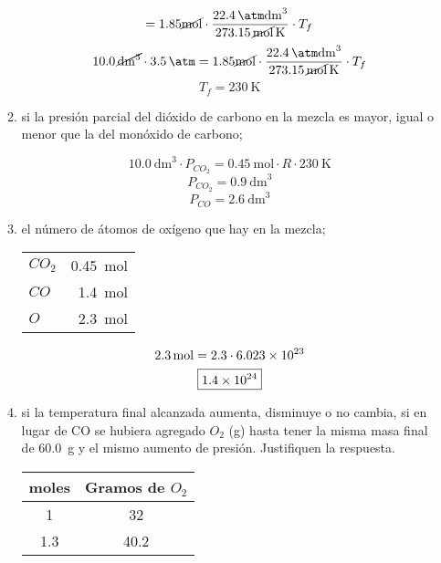 \documentclass[../practica.root.tex]{subfiles}
\begin{document}
\begin{enumerate}
\begin{enumerate}
\begin{center}
\[				            = \num{1,85}\si{\cancel\mole}
				            \cdot\frac{\SI{22,4}{\cancel\atm\cancel\dm\cubed}}{\SI{273,15}{\cancel\mole\kelvin}}
				            \cdot T_f
			            \]
			            \[
				            \SI{10,0}{\cancel\dm\cubed}\cdot\SI{3,5}{\cancel\atm}
				            = \num{1,85}\si{\cancel\mole}
				            \cdot\frac{\SI{22,4}{\cancel\atm\cancel\dm\cubed}}{\SI{273,15}{\cancel\mole\kelvin}}
				            \cdot T_f
			            \]
			            \[ \boxed{T_f = \SI{230}{\kelvin}} \]
		            \end{center}
		      \item si la presión parcial del dióxido de carbono en la mezcla es mayor, igual o menor que
		            la del monóxido de carbono;
		            \begin{center}
			            \[ \SI{10,0}{\dm\cubed}\cdot P_{CO_2} = \SI{0,45}{\mole}\cdot R\cdot\SI{230}{\kelvin} \]
			            \[ P_{CO_2} = \SI{0,9}{\dm\cubed} \]
			            \[ P_{CO} = \SI{2,6}{\dm\cubed} \]
		            \end{center}
		      \item el número de átomos de oxígeno que hay en la mezcla;
		            \begin{center}
			            \begin{tabular}{ l r }
				            $CO_2$ & \SI{0,45}{\mole} \\
				            $CO$   & \SI{1,4}{\mole}  \\
				            $O$    & \SI{2,3}{\mole}
			            \end{tabular}
			            \[ \SI{2,3}{\mole} = \num{2,3}\cdot\num{6,023E23} \]
			            \[ \boxed{\num{1,4E24}} \]
		            \end{center}
		      \item si la temperatura final alcanzada aumenta, disminuye o no cambia, si en lugar de CO
		            se hubiera agregado $O_2$ (g) hasta tener la misma masa final de \SI{60,0}{\gram} y el mismo
		            aumento de presión. Justifiquen la respuesta.
		            \begin{center}
			            \begin{tabular}{ c | c }
				            moles     & Gramos de $O_2$ \\
				            \hline
				            1         & 32              \\
				            \num{1,3} & \num{40,2}
			            \end{tabular}
			            \[
\]
\end{center}
\end{enumerate}
\end{enumerate}
\end{document}
